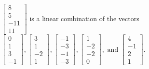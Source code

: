 \begin{exerciseAnswer}
\begin{enumerate}[(a)]
\( \left[\begin{array}{c}
8 \\
5 \\
-11 \\
11
\end{array}\right] \) is a linear combination of the vectors \( \left[\begin{array}{c}
0 \\
1 \\
3 \\
-1
\end{array}\right] , \left[\begin{array}{c}
3 \\
1 \\
-2 \\
1
\end{array}\right] , \left[\begin{array}{c}
-1 \\
-3 \\
-1 \\
-3
\end{array}\right] , \left[\begin{array}{c}
1 \\
-2 \\
-2 \\
0
\end{array}\right] , \text{ and } \left[\begin{array}{c}
4 \\
-1 \\
2 \\
1
\end{array}\right] \). 


\end{enumerate}
    
\end{exerciseAnswer}
    
